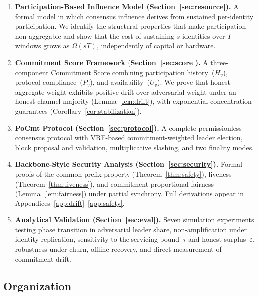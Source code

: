 \documentclass[10pt,journal,twoside]{IEEEtran}
\theoremstyle{remark}
\begin{document}
	\begin{enumerate}
		
		\item \textbf{Participation-Based Influence Model
			(Section~\ref{sec:resource}).}
		A formal model in which consensus influence derives from
		sustained per-identity participation.
		We identify the structural properties that make
		participation non-aggregable and show that the cost of
		sustaining $s$ identities over $T$ windows grows as
		$\Omega(sT)$, independently of capital or hardware.
		
		\item \textbf{Commitment Score Framework
			(Section~\ref{sec:score}).}
		A three-component Commitment Score combining
		participation history~($H_v$), protocol
		compliance~($P_v$), and availability~($U_v$).
		We prove that honest aggregate weight exhibits positive
		drift over adversarial weight under an honest channel
		majority (Lemma~\ref{lem:drift}), with exponential
		concentration guarantees
		(Corollary~\ref{cor:stabilization}).
		
		\item \textbf{PoCmt Protocol
			(Section~\ref{sec:protocol}).}
		A complete permissionless consensus protocol with
		VRF-based commitment-weighted leader election,
		block proposal and validation, multiplicative slashing,
		and two finality modes.
		
		\item \textbf{Backbone-Style Security Analysis
			(Section~\ref{sec:security}).}
		Formal proofs of the common-prefix property
		(Theorem~\ref{thm:safety}), liveness
		(Theorem~\ref{thm:liveness}), and
		commitment-proportional fairness
		(Lemma~\ref{lem:fairness}) under partial synchrony.
		Full derivations appear in
		Appendices~\ref{app:drift}--\ref{app:safety}.
		
		\item \textbf{Analytical Validation
			(Section~\ref{sec:eval}).}
		Seven simulation experiments testing phase transition
		in adversarial leader share, non-amplification under
		identity replication, sensitivity to the servicing
		bound~$\tau$ and honest surplus~$\varepsilon$,
		robustness under churn, offline recovery, and direct
		measurement of commitment drift.
		
	\end{enumerate}
	
	\subsection{Organization}
	
\end{document}
